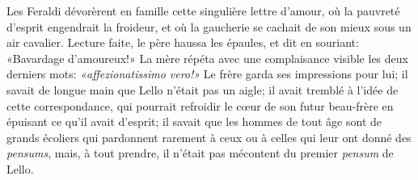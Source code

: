 Les Feraldi dévorèrent en famille cette singulière lettre d'amour, où la
pauvreté d'esprit engendrait la froideur, et où la gaucherie se cachait
de son mieux sous un air cavalier. Lecture faite, le père haussa les
épaules, et dit en souriant: «Bavardage d'amoureux!» La mère répéta avec
une complaisance visible les deux derniers mots: \emph{«affezionatissimo
vero!»} Le frère garda ses impressions pour lui; il savait de longue
main que Lello n'était pas un aigle; il avait tremblé à l'idée de cette
correspondance, qui pourrait refroidir le cœur de son futur beau-frère
en épuisant ce qu'il avait d'esprit; il savait que les hommes de tout
âge sont de grands écoliers qui pardonnent rarement à ceux ou à celles
qui leur ont donné des \emph{pensums}, mais, à tout prendre, il n'était
pas mécontent du premier \emph{pensum} de Lello.

